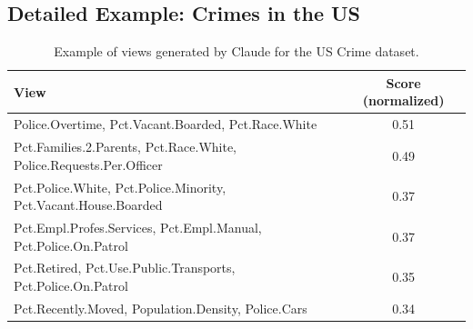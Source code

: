 \subsection{Detailed Example: Crimes in the US}
\label{sec:crime}
\begin{table}[t]
  \centering
  \small
  \begin{tabulary}{\columnwidth}{L c}
    \hline
    View & Score (normalized)\\
    \hline
    Police.Overtime, Pct.Vacant.Boarded, Pct.Race.White & 0.51\\
    Pct.Families.2.Parents, Pct.Race.White, Police.Requests.Per.Officer & 0.49\\
    Pct.Police.White, Pct.Police.Minority, Pct.Vacant.House.Boarded& 0.37\\
    Pct.Empl.Profes.Services, Pct.Empl.Manual, Pct.Police.On.Patrol & 0.37\\
    Pct.Retired, Pct.Use.Public.Transports, Pct.Police.On.Patrol& 0.35 \\
    Pct.Recently.Moved, Population.Density, Police.Cars & 0.34 \\
    \hline
\end{tabulary}
    \caption{Example of views generated by Claude for the US Crime dataset.}
    \label{tab:crime_views}
\end{table}
